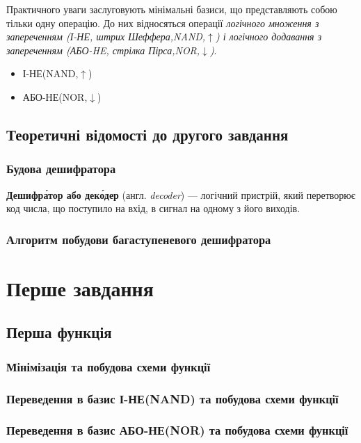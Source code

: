 Практичного уваги заслуговують мінімальні базиси, що представляють собою тільки одну операцію. До них відносяться операції \emph{логічного множення з запереченням (І-НЕ, штрих Шеффера,NAND,$\uparrow$) і логічного додавання з запереченням (АБО-HE, стрілка Пірса,NOR,$\downarrow$)}.

\begin{itemize}
	\item І-НЕ(NAND,$\uparrow$)
	\item АБО-НЕ(NOR,$\downarrow$)
\end{itemize}

\newpage
\section{Теоретичні відомості до другого завдання}
\subsection{Будова дешифратора}
\textbf{Дешифра́тор або деко́дер} (англ. \emph{decoder}) — логічний пристрій, який перетворює код числа, що поступило на вхід, в сигнал на одному з його виходів.
\newpage
\subsection{Алгоритм побудови багаступеневого дешифратора}

\newpage
\chapter{Перше завдання}
\section{Перша функція}
\newpage
\subsection{Мінімізація та побудова схеми функції}

\newpage
%
\subsection{Переведення в базис І-НЕ(NAND) та побудова схеми функції}
 
\newpage
%
\subsection{Переведення в базис АБО-НЕ(NOR) та побудова схеми функції}
 
